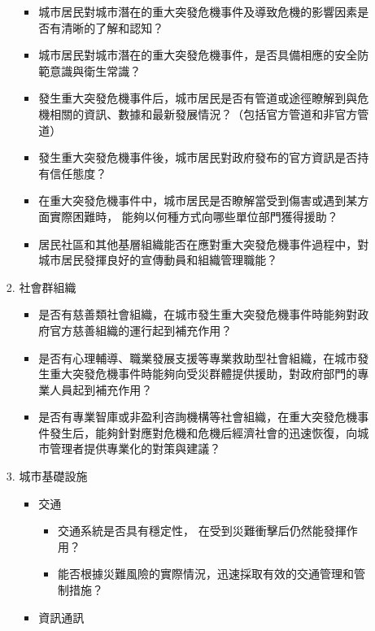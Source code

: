 \documentclass[a4paper,12pt]{article}
\begin{document}
\begin{enumerate}
\begin{enumerate}
\begin{enumerate}
\begin{itemize}
\item 城市居民對城市潛在的重大突發危機事件及導致危機的影響因素是否有清晰的了解和認知？\\
\item 城市居民對城市潛在的重大突發危機事件，是否具備相應的安全防範意識與衛生常識？\\
\item 發生重大突發危機事件后，城市居民是否有管道或途徑瞭解到與危機相關的資訊、數據和最新發展情況？（包括官方管道和非官方管道）\\
\item 發生重大突發危機事件後，城市居民對政府發布的官方資訊是否持有信任態度？\\
\item 在重大突發危機事件中，城市居民是否瞭解當受到傷害或遇到某方面實際困難時， 能夠以何種方式向哪些單位部門獲得援助？\\
\item 居民社區和其他基層組織能否在應對重大突發危機事件過程中，對城市居民發揮良好的宣傳動員和組織管理職能？\\
\end{itemize}
\item 社會群組織
\label{sec:orga85d890}
\begin{itemize}
\item 是否有慈善類社會組織，在城市發生重大突發危機事件時能夠對政府官方慈善組織的運行起到補充作用？\\
\item 是否有心理輔導、職業發展支援等專業救助型社會組織，在城市發生重大突發危機事件時能夠向受災群體提供援助，對政府部門的專業人員起到補充作用？\\
\item 是否有專業智庫或非盈利咨詢機構等社會組織，在重大突發危機事件發生后，能夠針對應對危機和危機后經濟社會的迅速恢復，向城市管理者提供專業化的對策與建議？\\
\end{itemize}
\item 城市基礎設施
\label{sec:org7da22ca}
\begin{itemize}
\item 交通
\label{sec:orgff19409}
\begin{itemize}
\item 交通系統是否具有穩定性， 在受到災難衝擊后仍然能發揮作用？\\
\item 能否根據災難風險的實際情況，迅速採取有效的交通管理和管制措施？\\
\end{itemize}
\item 資訊通訊

\end{itemize}
\end{enumerate}
\end{enumerate}
\end{enumerate}
\end{document}
